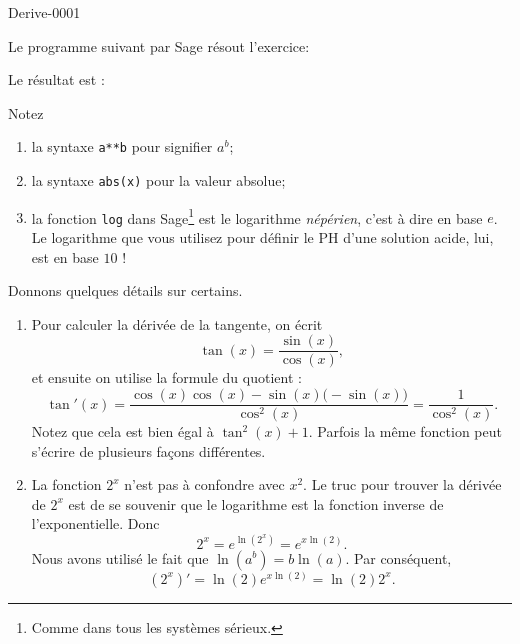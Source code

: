 
\begin{corrige}{Derive-0001}

Le programme suivant par Sage résout l'exercice:


Le résultat est :

Notez
\begin{enumerate}
	\item
		la syntaxe \verb+a**b+ pour signifier $a^b$;
	\item
		la syntaxe \verb+abs(x)+ pour la valeur absolue;
	\item
		la fonction \verb+log+ dans Sage\footnote{Comme dans tous les systèmes sérieux.} est le logarithme \emph{népérien}, c'est à dire en base $e$. Le logarithme que vous utilisez pour définir le PH d'une solution acide, lui, est en base $10$ !
\end{enumerate}

Donnons quelques détails sur certains.
\begin{enumerate}
	\item
		Pour calculer la dérivée de la tangente, on écrit
		\begin{equation}
			\tan(x)=\frac{ \sin(x) }{ \cos(x) },
		\end{equation}
		et ensuite on utilise la formule du quotient :
		\begin{equation}
			\tan'(x)=\frac{ \cos(x)\cos(x)-\sin(x)\big( -\sin(x) \big) }{ \cos^2(x) }=\frac{1}{ \cos^2(x) }.
		\end{equation}
		Notez que cela est bien égal à $\tan^2(x)+1$. Parfois la même fonction peut s'écrire de plusieurs façons différentes.
	\item
		La fonction $2^x$ n'est pas à confondre avec $x^2$. Le truc pour trouver la dérivée de $2^x$ est de se souvenir que le logarithme est la fonction inverse de l'exponentielle. Donc
		\begin{equation}
			2^x= e^{\ln(2^x)}= e^{x\ln(2)}.
		\end{equation}
		Nous avons utilisé le fait que $\ln(a^b)=b\ln(a)$. Par conséquent,
		\begin{equation}
			(2^x)'=\ln(2) e^{x\ln(2)}=\ln(2)2^{x}.
		\end{equation}
		

\end{enumerate}
\end{corrige}
